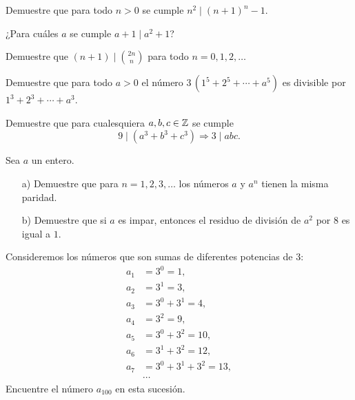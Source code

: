 \begin{ejercicio}
  Demuestre que para todo $n > 0$ se cumple $n^2 \mid (n+1)^n - 1$.
\end{ejercicio}

\begin{ejercicio}
  ¿Para cuáles $a$ se cumple $a+1 \mid a^2 + 1$?
\end{ejercicio}

\begin{ejercicio}
  Demuestre que $(n+1) \mid {2n \choose n}$ para todo $n = 0,1,2,\ldots$
\end{ejercicio}

\begin{ejercicio}
  Demuestre que para todo $a > 0$ el número $3\,(1^5 + 2^5 + \cdots + a^5)$ es
  divisible por $1^3 + 2^3 + \cdots + a^3$.
\end{ejercicio}

\begin{ejercicio}
  Demuestre que para cualesquiera $a,b,c \in \mathbb{Z}$ se cumple
  $$9 \mid (a^3 + b^3 + c^3) \Longrightarrow 3 \mid abc.$$
\end{ejercicio}

\begin{ejercicio}
  Sea $a$ un entero.

  \begin{enumerate}
  \item[a)] Demuestre que para $n = 1,2,3,\ldots$ los números $a$ y $a^n$ tienen
    la misma paridad.

  \item[b)] Demuestre que si $a$ es impar, entonces el residuo de división de
    $a^2$ por $8$ es igual a $1$.
  \end{enumerate}
\end{ejercicio}

\begin{ejercicio}
  Consideremos los números que son sumas de diferentes potencias de $3$:
  \begin{align*}
    a_1 & = 3^0 = 1, \\
    a_2 & = 3^1 = 3, \\
    a_3 & = 3^0 + 3^1 = 4, \\
    a_4 & = 3^2 = 9, \\
    a_5 & = 3^0 + 3^2 = 10, \\
    a_6 & = 3^1 + 3^2 = 12, \\
    a_7 & = 3^0 + 3^1 + 3^2 = 13, \\
        & \cdots
  \end{align*}
  Encuentre el número $a_{100}$ en esta sucesión.
\end{ejercicio}

